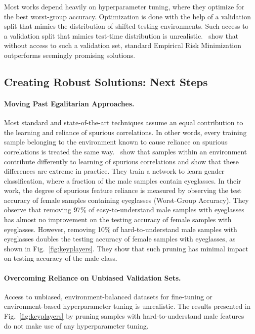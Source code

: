 Most works depend heavily on hyperparameter tuning, where they optimize for the best worst-group accuracy. Optimization is done with the help of a validation split that mimics the distribution of shifted testing environments. Such access to a validation split that mimics test-time distribution is unrealistic.~\cite{gulrajani2021ICLR} show that without access to such a validation set, standard Empirical Risk Minimization outperforms seemingly promising solutions.

\subsection{Creating Robust Solutions: Next Steps}

\paragraph{Moving Past Egalitarian Approaches.}

Most standard and state-of-the-art techniques assume an equal contribution to the learning and reliance of spurious correlations. In other words, every training sample belonging to the environment known to cause reliance on spurious correlations is treated the same way.~\cite{Mulchandani2025ICLR} show that samples within an environment contribute differently to learning of spurious correlations and show that these differences are extreme in practice. They train a network to learn gender classification, where a fraction of the male samples contain eyeglasses. In their work, the degree of spurious feature reliance is measured by observing the test accuracy of female samples containing eyeglasses (Worst-Group Accuracy). They observe that removing 97\% of easy-to-understand male samples with eyeglasses has almost no improvement on the testing accuracy of female samples with eyeglasses. However, removing 10\% of hard-to-understand male samples with eyeglasses doubles the testing accuracy of female samples with eyeglasses, as shown in Fig.~\ref{fig:keyplayers}. They show that such pruning has minimal impact on testing accuracy of the male class.


\paragraph{Overcoming Reliance on Unbiased Validation Sets.}

Access to unbiased, environment-balanced datasets for fine-tuning or environment-based hyperparameter tuning is unrealistic. The results presented in Fig.~\ref{fig:keyplayers} by pruning samples with hard-to-understand male features do not make use of any hyperparameter tuning.

